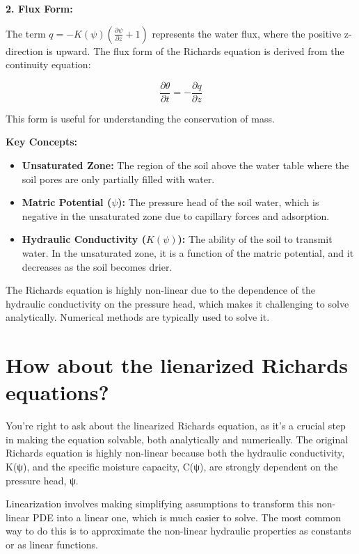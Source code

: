 \documentclass[
]{article}
\providecommand{\tightlist}{%
  \setlength{\itemsep}{0pt}\setlength{\parskip}{0pt}}
\begin{document}
\textbf{2. Flux Form:}

The term
\(q = -K(\psi) \left( \frac{\partial \psi}{\partial z} + 1 \right)\)
represents the water flux, where the positive z-direction is upward. The
flux form of the Richards equation is derived from the continuity
equation:

\[\frac{\partial \theta}{\partial t} = - \frac{\partial q}{\partial z}\]

This form is useful for understanding the conservation of mass.

\textbf{Key Concepts:}

\begin{itemize}
\tightlist
\item
  \textbf{Unsaturated Zone:} The region of the soil above the water
  table where the soil pores are only partially filled with water.
\item
  \textbf{Matric Potential (\(\psi\)):} The pressure head of the soil
  water, which is negative in the unsaturated zone due to capillary
  forces and adsorption.
\item
  \textbf{Hydraulic Conductivity (\(K(\psi)\)):} The ability of the soil
  to transmit water. In the unsaturated zone, it is a function of the
  matric potential, and it decreases as the soil becomes drier.
\end{itemize}

The Richards equation is highly non-linear due to the dependence of the
hydraulic conductivity on the pressure head, which makes it challenging
to solve analytically. Numerical methods are typically used to solve it.

\hypertarget{how-about-the-lienarized-richards-equations}{%
\section{How about the lienarized Richards
equations?}\label{how-about-the-lienarized-richards-equations}}

You're right to ask about the linearized Richards equation, as it's a
crucial step in making the equation solvable, both analytically and
numerically. The original Richards equation is highly non-linear because
both the hydraulic conductivity, K(ψ), and the specific moisture
capacity, C(ψ), are strongly dependent on the pressure head, ψ.

Linearization involves making simplifying assumptions to transform this
non-linear PDE into a linear one, which is much easier to solve. The
most common way to do this is to approximate the non-linear hydraulic
properties as constants or as linear functions.
\end{document}
